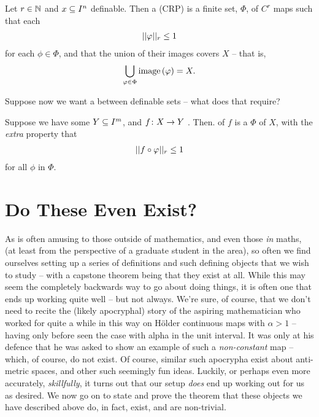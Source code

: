 \begin{definition}
  Let $r \in \N$ and $\CIn[x]{n}$ definable. Then a \emph{\cellrparam} (CRP) is a finite set, $\Phi$, of  $C^r$ \cellr maps such that each
    \begin{align*}
      \rnorm[r]{\phi} \leq 1
    \end{align*}
  for each $\phi \in \Phi$, and that the union of their images covers $X$ -- that is,
    \begin{align*}
      \bigcup_{\phi \in \Phi} \image{\phi} = X.
    \end{align*}
\end{definition}
Suppose now we want a \cellrparam between definable sets -- what does that require?
\begin{definition}
  Suppose we have some $\CIn[Y]{m}$, and $\funcdom{f}{X}{Y}$ . Then. \cellrparam[r] of $f$ is a \cellrparam[r] $\Phi$ of $X$, with the \emph{extra} property that
    \begin{align*}
      \rnorm[r]{f \circ \phi} \leq 1
    \end{align*}
    for all $\phi$ in $\Phi$.
\end{definition}

\section{Do These Even Exist?}

As is often amusing to those outside of mathematics, and even those \emph{in} maths, (at least from the perspective of a graduate student in the area), so often we find ourselves setting up a series of definitions and such defining objects that we wish to study -- with a capstone theorem being that they exist at all. While this may seem the completely backwards way to go about doing things, it is often one that ends up working quite well -- but not always. We're sure, of course, that we don't need to recite the (likely apocryphal) story of the aspiring mathematician who worked for quite a while in this way on H\"older continuous maps with $\alpha > 1$ -- having only before seen the case with alpha in the unit interval. It was only at his defence that he was asked to show an example of such a \emph{non-constant} map -- which, of course, do not exist. Of course, similar such apocrypha exist about anti-metric spaces, and other such seemingly fun ideas. Luckily, or perhaps even more accurately, \emph{skillfully}, it turns out that our setup \emph{does} end up working out for us as desired. We now go on to state and prove the theorem that these objects we have described above do, in fact, exist, and are non-trivial.

